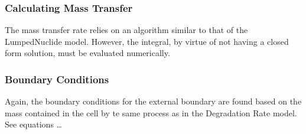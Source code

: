 \subsubsection{Calculating Mass Transfer}
The mass transfer rate relies on an algorithm similar to that of the 
LumpedNuclide model. However, the integral, by virtue of not having a closed 
form solution, must be evaluated numerically. 

\subsubsection{Boundary Conditions}
Again, the boundary conditions for the external boundary are found based on the 
mass contained in the cell by te same process as in the Degradation Rate model.
See equations \ldots 

